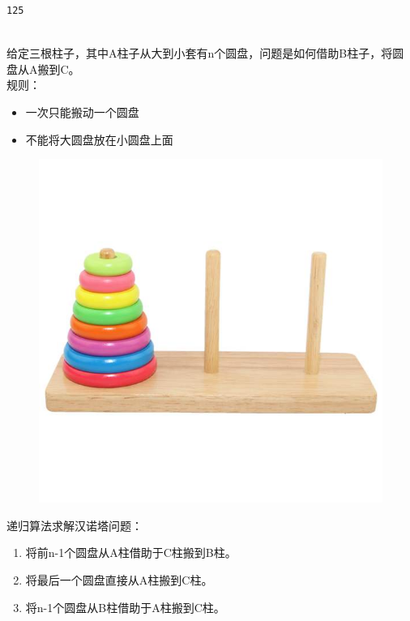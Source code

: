 \begin{tcolorbox}
	\begin{verbatim}
125
	\end{verbatim}
\end{tcolorbox}

\vspace{0.5cm}

\\

给定三根柱子，其中A柱子从大到小套有n个圆盘，问题是如何借助B柱子，将圆盘从A搬到C。\\

规则：

\begin{itemize}
	\item 一次只能搬动一个圆盘
	\item 不能将大圆盘放在小圆盘上面
\end{itemize}

\begin{figure}[H]
	\centering
	\includegraphics[scale=0.4]{img/Chapter5/5-3/3.png}
\end{figure}

递归算法求解汉诺塔问题：

\begin{enumerate}
	\item 将前n-1个圆盘从A柱借助于C柱搬到B柱。
	\item 将最后一个圆盘直接从A柱搬到C柱。
	\item 将n-1个圆盘从B柱借助于A柱搬到C柱。
\end{enumerate}

